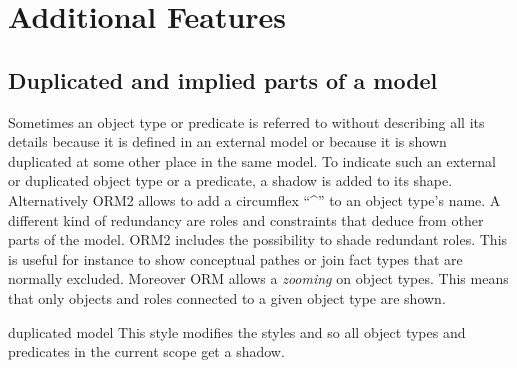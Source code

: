 \documentclass[a4paper,10pt]{article}
\begin{document}
\section{Additional Features}
\label{sec:additionalfeatures}

\subsection{Duplicated and implied parts of a model}
\label{sec:duplicatedandimplied}
Sometimes an object type or predicate is referred to without describing all its details because it is defined in an external model or because it is shown duplicated at some other place in the same model. To indicate such an external or duplicated object type or a predicate, a shadow is added to its shape. Alternatively ORM2 allows to add a circumflex ``\^{}'' to an object type's name. A different kind of redundancy are roles and constraints that deduce from other parts of the model. ORM2 includes the possibility to shade redundant roles. This is useful for instance to show conceptual pathes or join fact types that are normally excluded. Moreover ORM allows a \emph{zooming} on object types. This means that only objects and roles connected to a given object type are shown.

\begin{stylekey}{duplicated model}
This style modifies the styles  and  so all object types and predicates in the current scope get a shadow.
\begin{codeexample}[]
\end{codeexample}
\end{stylekey} %
\end{document}

